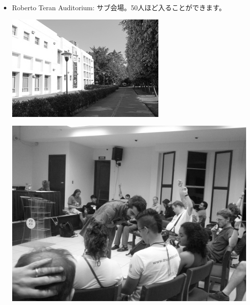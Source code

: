 \documentclass[mingoth,a4paper]{jsarticle}
\begin{document}
\begin{itemize}
  \item Roberto Teran Auditorium: サブ会場。50人ほど入ることができます。\\
        \begin{minipage}{0.4\hsize}
        \includegraphics[width=0.8\hsize]{image201208/debconf12_2ndtalkroom01_mono.jpg}
	\end{minipage}
        \begin{minipage}{0.4\hsize}
        \includegraphics[width=0.8\hsize]{image201208/debconf12_2ndtalkroom02_mono.jpg}
	\end{minipage}


\end{itemize}
\end{document}
